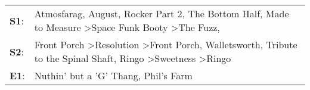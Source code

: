 \begin{supertabular}{p{0.03\textwidth}p{0.92\textwidth}}
 \textbf{S1}:  &                             Atmosfarag\textsuperscript{}, \enspace August\textsuperscript{}, \enspace Rocker Part 2\textsuperscript{}, \enspace The Bottom Half\textsuperscript{}, \enspace Made to Measure\textsuperscript{} \textgreater \enspace Space Funk Booty\textsuperscript{} \textgreater \enspace The Fuzz\textsuperscript{}, \textsuperscript{}  \enspace  \\
 \textbf{S2}:  &  Front Porch\textsuperscript{} \textgreater \enspace Resolution\textsuperscript{} \textgreater \enspace Front Porch\textsuperscript{}, \enspace Walletsworth\textsuperscript{}, \enspace Tribute to the Spinal Shaft\textsuperscript{}, \enspace Ringo\textsuperscript{} \textgreater \enspace Sweetness\textsuperscript{} \textgreater \enspace Ringo\textsuperscript{}  \enspace  \\
 \textbf{E1}:  &                                                                                                                                                                                                                                                                                        Nuthin' but a 'G' Thang\textsuperscript{}, \enspace Phil's Farm\textsuperscript{}  \enspace  \\
\end{supertabular}
